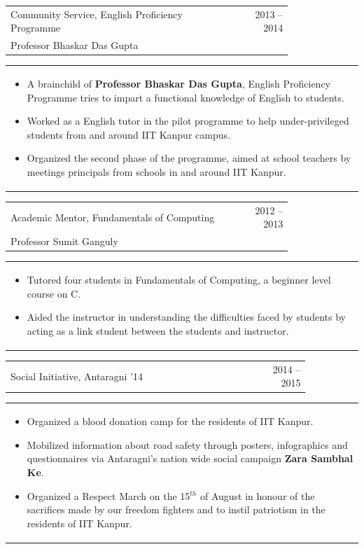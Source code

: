 \documentclass[a4paper,10pt]{article} %
\newcommand{\lproject}[4]{
    \begin{tabular}{p{0.80\linewidth}r}
        \textcolor{NavyBlue}{#2} & \multicolumn{1}{m{4cm}}{\raggedleft \textsc{#1}}\\
        #3
    \end{tabular}
    \begin{tabular}{p{\linewidth}}
    \vspace{-0.3cm}
        \footnotesize{#4}
    \end{tabular}
    \vspace{-0.5cm}
}
\newcommand{\iproject}[3]{
    \begin{tabular}{p{0.85\linewidth}r}
        \textcolor{NavyBlue}{#2} & \multicolumn{1}{m{3cm}}{\raggedleft \textsc{#1}}\\
    \end{tabular}
    \begin{tabular}{p{\linewidth}}
    \vspace{-0.3cm}
        \footnotesize{#3}
    \end{tabular}
    \vspace{-0.5cm}
}
\begin{document}
\lproject {2013 -- 2014}
          {Community Service, English Proficiency Programme}
          {Professor Bhaskar Das Gupta}
          {
               \begin{itemize}[leftmargin=0.5cm]
                   \item A brainchild of \textbf{Professor Bhaskar Das Gupta}, English Proficiency Programme tries to impart a functional
                       knowledge of English to students.
                   \item Worked as a English tutor in the pilot programme to help under-privileged students from and around IIT Kanpur campus.
                   \item Organized the second phase of the programme, aimed at school teachers by meetings principals from schools in and
                       around IIT Kanpur.
               \end{itemize}
          }

\lproject {2012 -- 2013}
          {Academic Mentor, Fundamentals of Computing}
          {Professor Sumit Ganguly}
          {
               \begin{itemize}[leftmargin=0.5cm]
                   \item Tutored four students in Fundamentals of Computing, a beginner level course on C.
                   \item Aided the instructor in understanding the difficulties faced by students by acting as a link
                       student between the students and instructor.
               \end{itemize}
          }

\iproject {2014 -- 2015}
          {Social Initiative, Antaragni '14}
          {
               \begin{itemize}[leftmargin=0.5cm]
                   \item Organized a blood donation camp for the residents of IIT Kanpur.
                   \item Mobilized information about road safety through posters, infographics and questionnaires
                       via Antaragni's nation wide social campaign \textbf{Zara Sambhal Ke}.
                   \item Organized a Respect March on the 15$^{th}$ of August in honour of the sacrifices made by our
                       freedom fighters and to instil patriotism in the residents of IIT Kanpur.
               \end{itemize}
          }
\end{document}
